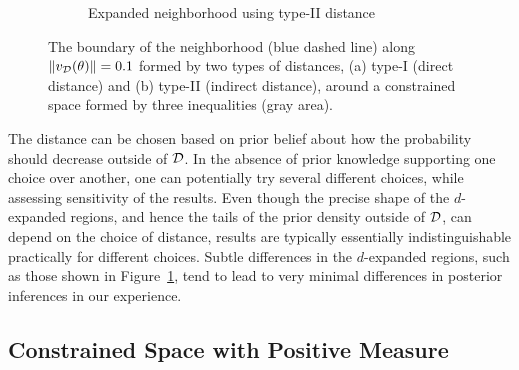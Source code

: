 \documentclass[10pt,fleqn]{article}
\DeclareMathOperator{\1}{\mathbbm{1}} \DeclareMathOperator{\bigO}{\mc O}
\begin{document}
\begin{figure}[h]
\begin{subfigure}[b]{0.45\textwidth}
{}
        \caption{Expanded neighborhood using type-II distance}
    \end{subfigure}

 \caption{The boundary of the neighborhood (blue dashed line) along $\|v_{\mathcal{D}}(\theta)\| = 0.1$  formed by two types of distances, (a) type-I (direct distance) and (b) type-II (indirect distance), 
around a constrained space formed by three inequalities (gray area).
\label{fig:two_distances}}
\end{figure}

The distance can be chosen based on prior belief about how the probability should decrease outside of $\mathcal{D}$.  In the absence of prior knowledge supporting one choice over another, one can potentially try several different choices, while assessing sensitivity of the results.  Even though the precise shape of the $d$-expanded regions, and hence the tails of the prior density outside of $\mathcal{D}$, can depend on the choice of distance, results are typically essentially indistinguishable practically for different choices.  Subtle differences in the $d$-expanded regions, such as those shown in Figure~\ref{fig:two_distances}, tend to lead to very minimal differences in posterior inferences in our experience.




\subsection{Constrained Space with Positive Measure}
\end{document}
